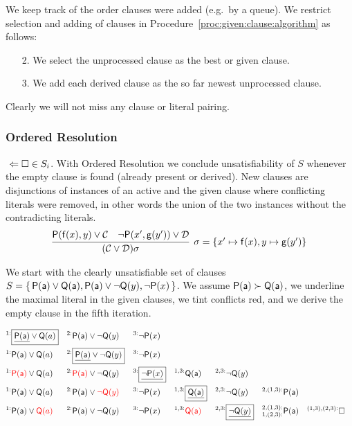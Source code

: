 \begin{definition}
	We keep track of the order clauses were added (e.g.\ by a queue).
	We restrict selection and adding of clauses
	in Procedure~\ref{proc:given:clause:algorithm} as follows:
	\begin{enumerate}
		\item[2.]
		We select the  unprocessed clause as the best or given clause.
		\item[3.]
		We add each derived clause
		as the so far newest unprocessed clause.
	\end{enumerate}
Clearly we will not miss any clause or literal pairing.
\end{definition}

\subsubsection{Ordered Resolution}

\jek{} \( \ \Leftarrow\square\in S_i \).
With Ordered Resolution we conclude unsatisfiability of \( S \) whenever the empty clause is found (already present or derived).
New clauses are disjunctions of instances of an active and the given clause where conflicting literals were removed,
in other words the union of the two instances without the contradicting literals.
\begin{gather*}
\infer[\sigma=\{ x'\mapsto\mf(x), y\mapsto\mg(y') \}]{
	(\mcC \lor \mcD)\sigma
}{
	\mP(\mf(x), y) \lor \mcC & \lnot\mP(x',\mg(y')) \lor \mcD
}
\end{gather*}

\begin{example}
	We start with the clearly unsatisfiable set of clauses
\( S=\{ \, \mathsf{P}(\mathsf{a})\lor\mathsf{Q}(\mathsf{a}), \mathsf{P}(\mathsf{a})\lor\lnot\mathsf{Q}(y), \lnot\mathsf{P}(x) \, \} \).
	We assume \( \mathsf{P}(\mathsf{a})\succ\mathsf{Q}(\mathsf{a}) \),
	we underline the maximal literal in the given clauses,
	we tint conflicts red,
	 and we derive the empty clause in the fifth iteration.

	\begin{align*}
	^{1:}&\boxed{\underline{\mP(\ma)}\lor\mQ(a)}
	& ^{2:}&\mP(\ma)\lor\lnot\mQ(y) & ^{3:}&\lnot\mP(x)
	\\
	^{1:}&\mP(\ma)\lor\mQ(a)
	& ^{2:}&\boxed{\underline{\mP(\ma)}\lor\lnot\mQ(y)} & ^{3:}&\lnot\mP(x)
	\\
	^{1:}&{\colLo\mP(\ma)}\lor\mQ(a)
	& ^{2:}&{\colLo\mP(\ma)}\lor\lnot\mQ(y)
	& ^{3:}&\boxed{\underline{\lnot\mP(x)}}
	& ^{1,3:}&\mQ(\ma)
	& ^{2,3:}&\lnot\mQ(y)
	\\
	^{1:}&\mP(\ma)\lor\mQ(a)
	& ^{2:}&\mP(\ma)\lor{\colLo\lnot\mQ(y)}
	& ^{3:}&\lnot\mP(x)
	& ^{1,3:}&\boxed{\underline{\mQ(\ma)}}
	& ^{2,3:}&\lnot\mQ(y)
	& ^{2,(1,3):}&\mP(\ma)
	\\
	^{1:}&\mP(\ma)\lor{\colLo\mQ(a)}
	& ^{2:}&\mP(\ma)\lor\lnot\mQ(y)
	& ^{3:}&\lnot\mP(x)
	& ^{1,3:}&\colLo\mQ(\ma)
	& ^{2,3:}&\boxed{\underline{\lnot\mQ(y)}}
	& ^{2,(1,3):}_{1,(2,3):}&\mP(\ma)
	& ^{(1,3),(2,3):}&\emptyclause
	\\
	\end{align*}
\end{example}

